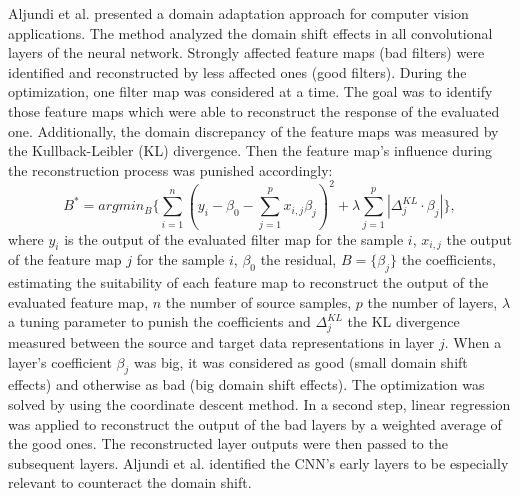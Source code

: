 Aljundi et al. \cite{Aljundi2016} presented a domain adaptation approach for computer vision applications. The method analyzed the domain shift effects in all convolutional layers of the neural network. Strongly affected feature maps (bad filters) were identified and reconstructed by less affected ones (good filters). During the optimization, one filter map was considered at a time. The goal was to identify those feature maps which were able to reconstruct the response of the evaluated one. Additionally, the domain discrepancy of the feature maps was measured by the Kullback-Leibler (KL) divergence. Then the feature map's influence during the reconstruction process was punished accordingly:  
\begin{equation}
    B^{*} = argmin_{B} \{ \sum_{i=1}^{n}( y_{i}-\beta_{0}-\sum_{j=1}^{p}x_{i,j}\beta_{j})^{2} + \lambda \sum_{j=1}^{p}|\Delta_{j}^{KL}\cdot \beta_{j}| \},
\end{equation}
where $y_{i}$ is the output of the evaluated filter map for the sample $i$, $x_{i,j}$ the output of the feature map $j$ for the sample $i$, $\beta_{0}$ the residual, $B = \{\beta_{j}\}$ the coefficients, estimating the suitability of each feature map to reconstruct the output of the evaluated feature map, $n$ the number of source samples, $p$ the number of layers, $\lambda$ a tuning parameter to punish the coefficients and $\Delta_{j}^{KL}$ the KL divergence measured between the source and target data representations in layer $j$. When a layer's coefficient  $\beta_{j}$ was big, it was considered as good (small domain shift effects) and otherwise as bad (big domain shift effects). The optimization was solved by using the coordinate descent method. In a second step, linear regression was applied to reconstruct the output of the bad layers by a weighted average of the good ones. The reconstructed layer outputs were then passed to the subsequent layers. Aljundi et al. \cite{Aljundi2016} identified the CNN's early layers to be especially relevant to counteract the domain shift.

